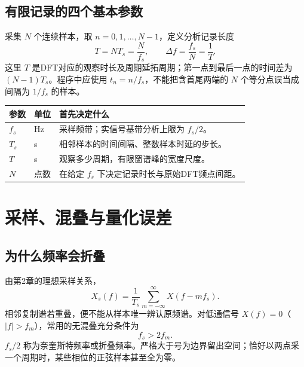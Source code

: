 
\subsection{有限记录的四个基本参数}
采集 $N$ 个连续样本，取 $n=0,1,\ldots,N-1$，定义分析记录长度
\[
\boxed{T=NT_s=\frac{N}{f_s}},\qquad
\boxed{\Delta f=\frac{f_s}{N}=\frac{1}{T}}.
\]
这里 $T$ 是DFT对应的观察时长及周期延拓周期；第一点到最后一点的时间差为 $(N-1)T_s$。程序中应使用 $t_n=n/f_s$，不能把含首尾两端的 $N$ 个等分点误当成间隔为 $1/f_s$ 的样本。

\begin{table}[H]
\centering\small
\begin{tabularx}{\linewidth}{@{}l l X@{}}
\toprule
参数 & 单位 & 首先决定什么 \\
\midrule
$f_s$ & Hz & 采样频带；实信号基带分析上限为 $f_s/2$。 \\
$T_s$ & s & 相邻样本的时间间隔、整数样本时延的步长。 \\
$T$ & s & 观察多少周期，有限窗谱峰的宽度尺度。 \\
$N$ & 点数 & 在给定 $f_s$ 下决定记录时长与原始DFT频点间距。 \\
\bottomrule
\end{tabularx}
\end{table}

\Needspace{8cm}
\section{采样、混叠与量化误差}

\subsection{为什么频率会折叠}
\noindent{}

由第2章的理想采样关系，
\[
X_s(f)=\frac{1}{T_s}\sum_{m=-\infty}^{\infty}X(f-mf_s).
\]
相邻复制谱若重叠，便不能从样本唯一辨认原频谱。对低通信号 $X(f)=0$（$|f|>f_m$），常用的无混叠充分条件为
\[
\boxed{f_s>2f_m}.
\]
$f_s/2$ 称为奈奎斯特频率或折叠频率。严格大于号为边界留出空间；恰好以两点采一个周期时，某些相位的正弦样本甚至全为零。

